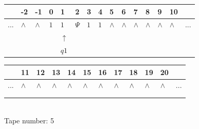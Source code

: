 \documentclass[11pt]{article}
\begin{document}
\begin{table}[H]
\centering
\begin{tabular}{lllllllllllllll}
 & -2 & -1 & 0 & 1 & 2 & 3 & 4 & 5 & 6 & 7 & 8 & 9 & 10 & \\
\hline
$...$ & \multicolumn{1}{|l|}{$\wedge$} & \multicolumn{1}{|l|}{$\wedge$} & \multicolumn{1}{|l|}{$1$} & \multicolumn{1}{|l|}{$1$} & \multicolumn{1}{|l|}{$\Psi$} & \multicolumn{1}{|l|}{$1$} & \multicolumn{1}{|l|}{$1$} & \multicolumn{1}{|l|}{$\wedge$} & \multicolumn{1}{|l|}{$\wedge$} & \multicolumn{1}{|l|}{$\wedge$} & \multicolumn{1}{|l|}{$\wedge$} & \multicolumn{1}{|l|}{$\wedge$} & \multicolumn{1}{|l|}{$\wedge$} & $...$\\
\hline
&  &  &  & $\uparrow$ &  &  &  &  &  &  &  &  &  &  \\
&  &  &  & $ q1 $ &  &  &  &  &  &  &  &  &  &  \\
\end{tabular}
\begin{tabular}{llllllllllll}
 & 11 & 12 & 13 & 14 & 15 & 16 & 17 & 18 & 19 & 20 & \\
\hline
$...$ & \multicolumn{1}{|l|}{$\wedge$} & \multicolumn{1}{|l|}{$\wedge$} & \multicolumn{1}{|l|}{$\wedge$} & \multicolumn{1}{|l|}{$\wedge$} & \multicolumn{1}{|l|}{$\wedge$} & \multicolumn{1}{|l|}{$\wedge$} & \multicolumn{1}{|l|}{$\wedge$} & \multicolumn{1}{|l|}{$\wedge$} & \multicolumn{1}{|l|}{$\wedge$} & \multicolumn{1}{|l|}{$\wedge$} & $...$\\
\hline
&  &  &  &  &  &  &  &  &  &  &  \\
&  &  &  &  &  &  &  &  &  &  &  \\
\end{tabular}
\\
Tape number: 5
\noindent\makebox[\linewidth]{\hdashrule{\textwidth}{1pt}{1pt}}\end{table}
\end{document}
